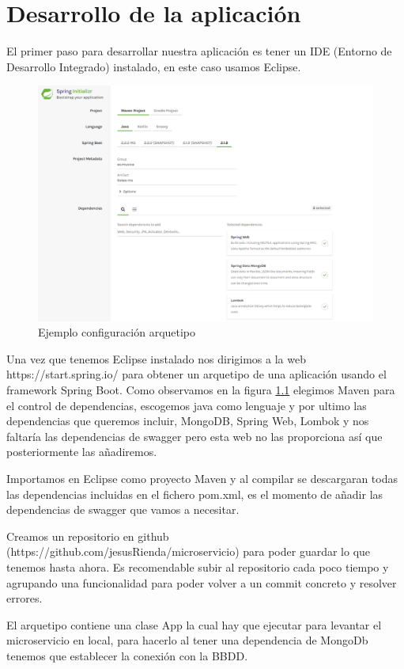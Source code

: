 \documentclass[12pt]{report} %
\begin{document}
\chapter{Desarrollo de la aplicación}

El primer paso para desarrollar nuestra aplicación es tener un IDE (Entorno de Desarrollo Integrado) instalado, en este caso usamos Eclipse.

\begin{figure}
	\centering
	\includegraphics[width=0.7\linewidth]{imagenes/arquetipo}
	\caption{Ejemplo configuración arquetipo}
	\label{fig:arquetipo}
\end{figure}

Una vez que tenemos Eclipse instalado nos dirigimos a la web https://start.spring.io/ para obtener un arquetipo de una aplicación usando el framework Spring Boot. Como observamos en la figura \ref{fig:arquetipo} elegimos Maven para el control de dependencias, escogemos java como lenguaje y por ultimo las dependencias que queremos incluir, MongoDB, Spring Web, Lombok y nos faltaría las dependencias de swagger pero esta web no las proporciona así que posteriormente las añadiremos.

Importamos en Eclipse como proyecto Maven y al compilar se descargaran todas las dependencias incluidas en el fichero pom.xml, es el momento de añadir las dependencias de swagger que vamos a necesitar.

Creamos un repositorio en github (https://github.com/jesusRienda/microservicio) para poder guardar lo que tenemos hasta ahora. Es recomendable subir al repositorio cada poco tiempo y agrupando una funcionalidad para poder volver a un commit concreto y resolver errores.

El arquetipo contiene una clase App la cual hay que ejecutar para levantar el microservicio en local, para hacerlo al tener una dependencia de MongoDb tenemos que establecer la conexión con la BBDD.
\end{document}
